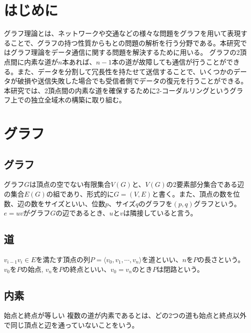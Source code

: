 \documentclass[twocolumn, 11pt]{jsarticle}
\begin{document}
 


\section{はじめに}
    グラフ理論とは、ネットワークや交通などの様々な問題をグラフを用いて表現することで、グラフの持つ性質からもとの問題の解析を行う分野である。本研究ではグラフ理論をデータ通信に関する問題を解決するために用いる。
    グラフの2頂点間に内素な道が$n$本あれば、$n-1$本の道が故障しても通信が行うことができる。また、データを分割して冗長性を持たせて送信することで、いくつかのデータが破損や送信失敗した場合でも受信者側でデータの復元を行うことができる。
    本研究では、2頂点間の内素な道を確保するために2-コーダルリングというグラフ上での独立全域木の構築に取り組む。

\section{グラフ}
    \subsection{グラフ}
        グラフ$G$は頂点の空でない有限集合$V(G)$と、$V(G)$の2要素部分集合である辺の集合$E(G)$の組であり、形式的に$G=(V,E)$と書く。また、頂点の数を位数、辺の数をサイズといい、位数$p$、サイズ$q$のグラフを$(p,q)$グラフという。
        $e = uv$がグラフ$G$の辺であるとき、$u$と$v$は隣接していると言う\cite{2006離散数学入門}。
    
    \subsection{道}
        $v_{i-1}v_i \in E$を満たす頂点の列$P = \langle v_0, v_1, \cdots, v_n \rangle$を道といい、$n$を$P$の長さという。$v_0$を$P$の始点, $v_n$を$P$の終点といい、$v_0 = v_n$のとき$P$は閉路という\cite{2006離散数学入門}。

    \subsection{内素}
       始点と終点が等しい 複数の道が内素であるとは、どの2つの道も始点と終点以外で同じ頂点と辺を通っていないことをいう\cite{chartrand1993applied}。
    
\end{document}
